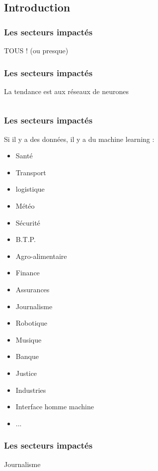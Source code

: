 \subsection{Introduction}

\begin{frame}
  \frametitle{Les secteurs impactés}
  \begin{center}
    \huge TOUS ! (ou presque)
  \end{center}
\end{frame}

\begin{frame}
  \frametitle{Les secteurs impactés}
  \begin{center}
    La tendance est aux réseaux de neurones
  \end{center}
  $\;$ \\
  \begin{minipage}[c]{0.49\linewidth}
  \end{minipage}\hfill
  \begin{minipage}[c]{0.49\linewidth}
  \end{minipage}\hfill
\end{frame}

\begin{frame}
  \frametitle{Les secteurs impactés}
  Si il y a des données, il y a du machine learning :
  \newline
  \newline
  \begin{minipage}[c]{0.49\linewidth}
    \begin{itemize}
    \item Santé 
    \item Transport
    \item logistique
    \item Météo
    \item Sécurité
    \item B.T.P.
    \item Agro-alimentaire    
    \item Finance
    \item Assurances
    \end{itemize}
  \end{minipage}\hfill
  \begin{minipage}[c]{0.49\linewidth}
    \begin{itemize}
    \item Journalisme
    \item Robotique
    \item Musique
    \item Banque
    \item Justice
    \item Industries
    \item Interface homme machine
    \item ...
    \end{itemize}
  \end{minipage}\hfill
\end{frame}

\begin{frame}
  \frametitle{Les secteurs impactés}
  Journalisme
\end{frame}

